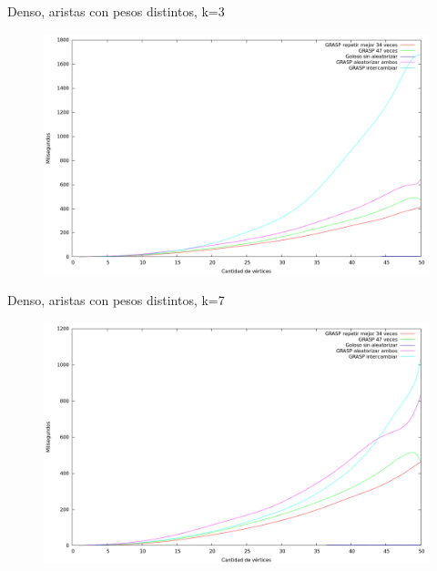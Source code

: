 \vspace*{0.5cm}

Denso, aristas con pesos distintos, k=3
\vspace*{0.5cm}

\begin{figure}[H]
  \begin{center}
    \includegraphics[scale=0.35]{imagenes/ej6-denso-pesos-distintos-k3-tiempo.png}
  \end{center}
\end{figure}

\vspace*{0.5cm}

Denso, aristas con pesos distintos, k=7
\vspace*{0.5cm}

\begin{figure}[H]
  \begin{center}
    \includegraphics[scale=0.35]{imagenes/ej6-denso-pesos-distintos-k7-tiempo.png}
  \end{center}
\end{figure}

